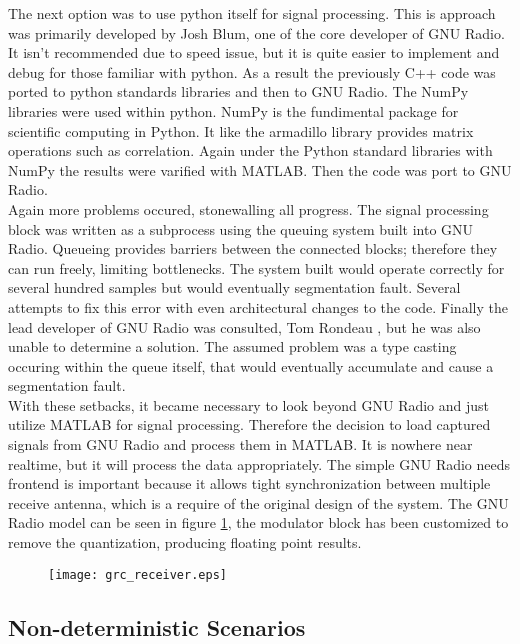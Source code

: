 The next option was to use python itself for signal processing.  This is approach was primarily developed by Josh Blum, one of the core developer of GNU Radio.  It isn't recommended due to speed issue, but it is quite easier to implement and debug for those familiar with python.  As a result the previously C++ code was ported to python standards libraries and then to GNU Radio.  The NumPy libraries were used within python.  NumPy is the fundimental package for scientific computing in Python\cite{numpy}.  It like the armadillo library provides matrix operations such as correlation.  Again under the Python standard libraries with NumPy the results were varified with MATLAB.  Then the code was port to GNU Radio.\\

Again more problems occured, stonewalling all progress.  The signal processing block was written as a subprocess using the queuing system built into GNU Radio.  Queueing provides barriers between the connected blocks; therefore they can run freely, limiting bottlenecks. The system built would operate correctly for several hundred samples but would eventually segmentation fault.  Several attempts to fix this error with even architectural changes to the code.  Finally the lead developer of GNU Radio was consulted, Tom Rondeau \cite{tomrondeau}, but he was also unable to determine a solution.  The assumed problem was a type casting occuring within the queue itself, that would eventually accumulate and cause a segmentation fault.\\

With these setbacks, it became necessary to look beyond GNU Radio and just utilize MATLAB for signal processing.  Therefore the decision to load captured signals from GNU Radio and process them in MATLAB.  It is nowhere near realtime, but it will process the data appropriately.  The simple GNU Radio needs frontend is important because it allows tight synchronization between multiple receive antenna, which is a require of the original design of the system.  The GNU Radio model can be seen in figure \ref{grc_receiver}, the modulator block has been customized to remove the quantization, producing floating point results.\\

\begin{figure}\label{grc_receiver}
\texttt{[image: grc\_receiver.eps]}
\end{figure}

\subsection{Non-deterministic Scenarios}

